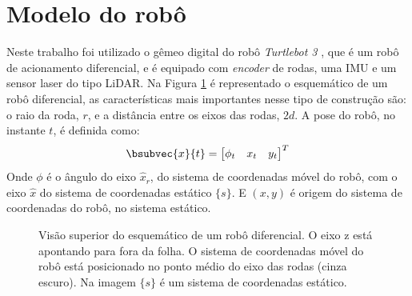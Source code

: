 \section{Modelo do robô}
Neste trabalho foi utilizado o gêmeo digital do robô \emph{Turtlebot 3} \cite{TurtleBot_3}, que é um robô de acionamento diferencial, e é equipado com 
\textit{encoder} de rodas, uma IMU e um sensor laser do tipo LiDAR. Na Figura 
\ref{fig:diff-drive-schematic} é representado o esquemático de um robô diferencial, as características mais importantes nesse tipo de construção 
são: o raio da roda, $r$, e a distância entre os eixos das rodas, $2d$. A 
pose do robô, no instante $t$, é definida como:
\begin{equation}
  \bsubvec{x}{t} = \begin{bmatrix}
    \phi_t & x_t & y_t
  \end{bmatrix}^T
  \label{eq:robot-pose}
\end{equation}
Onde $\phi$ é o ângulo do eixo $\hat{x}_r$, do sistema de coordenadas móvel 
do robô, com o eixo $\hat{x}$ do sistema de coordenadas estático $\{s\}$. E $(x, y)$ é origem do sistema de coordenadas do robô, no sistema estático.
\begin{figure}[h]
  \centering
  
  \caption{Visão superior do esquemático de um robô diferencial. O eixo z está apontando para fora 
  da folha. O sistema de coordenadas móvel do robô está posicionado no ponto médio do eixo das rodas  (cinza escuro). Na imagem $\{s\}$ é um sistema de coordenadas estático.}
  \label{fig:diff-drive-schematic}
\end{figure}

